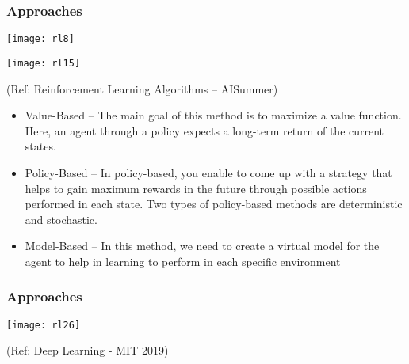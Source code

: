 \begin{frame}[fragile]\frametitle{Approaches}

\begin{center}
\texttt{[image: rl8]}

\texttt{[image: rl15]}

\end{center}

{\tiny (Ref: Reinforcement Learning Algorithms – AISummer)} 


\begin{itemize}
\item Value-Based – The main goal of this method is to maximize a value function. Here, an agent through a policy expects a long-term return of the current states.

\item Policy-Based – In policy-based, you enable to come up with a strategy that helps to gain maximum rewards in the future through possible actions performed in each state. Two types of policy-based methods are deterministic and stochastic.

\item Model-Based – In this method, we need to create a virtual model for the agent to help in learning to perform in each specific environment
\end{itemize}

\end{frame}

\begin{frame}[fragile]\frametitle{Approaches}
\begin{center}
\texttt{[image: rl26]}
\end{center}

{\tiny (Ref: Deep Learning - MIT 2019)}

\end{frame}



